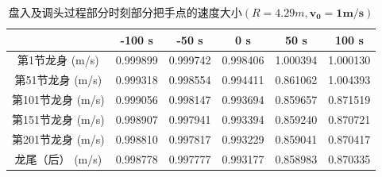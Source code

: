 \documentclass[withoutpreface,bwprint]{cumcmthesis} %
\begin{document}
\begin{table}[H]
    \centering
    \caption{盘入及调头过程部分时刻部分把手点的速度大小$(R=4.29m,\bm{v_0=1m/s})$}
    \label{table6}
    \begin{tabular}{cccccc}
        \toprule[2pt]
        ~ &-100 s & -50 s & 0 s & 50 s & 100 s \\ 
        \midrule[1pt]
        第1节龙身  (m/s) & 0.999899  & 0.999742  & 0.998406  & 1.000394  & 1.000130  \\
        第51节龙身  (m/s) & 0.999318  & 0.998554  & 0.994411  & 0.861062  & 1.004393  \\ 
        第101节龙身  (m/s) & 0.999056  & 0.998147  & 0.993694  & 0.859657  & 0.871519  \\
        第151节龙身  (m/s) & 0.998907  & 0.997941  & 0.993394  & 0.859240  & 0.870721  \\ 
        第201节龙身  (m/s) & 0.998810  & 0.997817  & 0.993229  & 0.859041  & 0.870417  \\ 
        龙尾（后） (m/s) & 0.998778  & 0.997777  & 0.993177  & 0.858983  & 0.870335 \\ 
        \bottomrule[2pt]
    \end{tabular}
\end{table}
\end{document}

